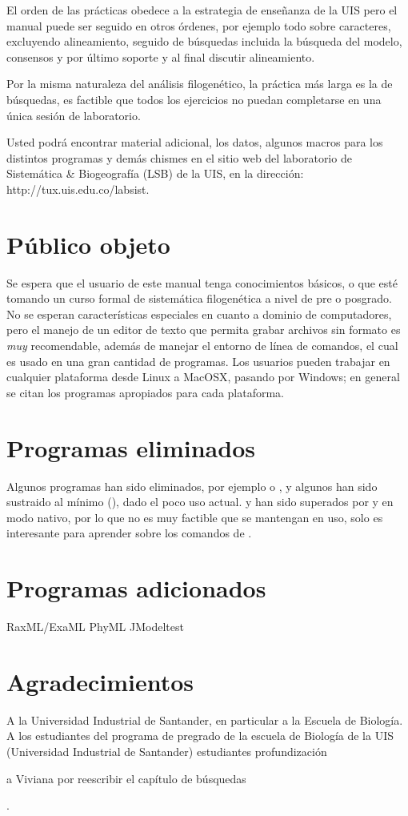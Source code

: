El orden de las pr\'acticas obedece a la estrategia de ense\~nanza de la UIS pero  el manual puede ser seguido en otros \'ordenes, por ejemplo todo sobre caracteres, excluyendo alineamiento, seguido de b\'usquedas incluida la b\'usqueda del modelo, consensos y por \'ultimo soporte y al final discutir alineamiento.

Por la misma naturaleza del an\'alisis filogen\'etico, la pr\'actica m\'as larga es la de b\'usquedas, es factible que todos los ejercicios no puedan completarse en una \'unica sesi\'on de laboratorio.

Usted podr\'a encontrar material adicional, los datos, algunos macros para los distintos programas y dem\'as chismes en el sitio web del laboratorio de Sistem\'atica \& Biogeograf\'ia (LSB) de la UIS, en la direcci\'on: http://tux.uis.edu.co/labsist.
\section*{P\'ublico objeto}
Se espera que el usuario de este manual tenga conocimientos b\'asicos, o que est\'e tomando un curso formal de sistem\'atica filogen\'etica a nivel de pre o posgrado. No se esperan caracter\'isticas especiales en cuanto a dominio de computadores, pero el manejo de un editor de texto que permita grabar archivos sin formato es \emph{muy} recomendable, adem\'as de manejar el entorno de l\'inea de comandos, el cual es usado en una gran cantidad de programas. Los usuarios pueden trabajar en cualquier plataforma desde Linux a 
MacOSX, pasando por Windows; en general se citan los programas apropiados para cada plataforma.

\section*{Programas eliminados}
Algunos programas han sido eliminados, por ejemplo  o , y algunos han sido sustraido al m\'inimo (), dado el poco uso actual.  y  han sido superados por  y  en modo nativo, por lo que no es muy factible que se mantengan en uso, solo  es interesante para aprender sobre los comandos de .


\section*{Programas adicionados}
RaxML/ExaML
PhyML
JModeltest



\section*{Agradecimientos}
A la Universidad Industrial de Santander, en particular a la Escuela de Biolog\'ia. A los estudiantes del programa de pregrado de la escuela de Biolog\'ia de la UIS (Universidad Industrial de Santander) 
estudiantes profundizaci\'on

a Viviana por reescribir el cap\'itulo de b\'usquedas



.